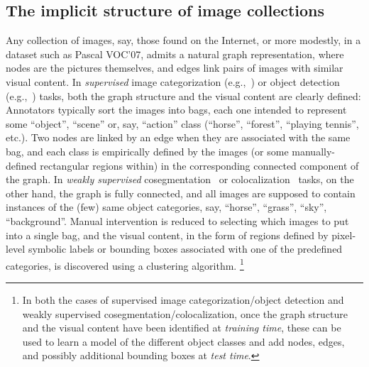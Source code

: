 \documentclass[10pt,twocolumn,letterpaper]{article}
\numberwithin{theorem}{section}
\begin{document}
\subsection{The implicit structure of image collections}
Any collection of images, say, those found on the Internet, or more
modestly, in a dataset such as Pascal VOC'07, admits a natural graph
representation, where nodes are the pictures themselves, and edges
link pairs of images with similar visual content.  In {\em supervised}
image categorization
(e.g.,~\cite{krizhevsky2012imagenet,Lazebnik2006}) or object
detection (e.g.,~\cite{felzenszwalb2010object,He17,Ren15}) tasks, both the graph
structure and the visual content are clearly defined: Annotators
typically sort the images into bags, each one intended to represent
some ``object'', ``scene'' or, say, ``action'' class (``horse'',
``forest'', ``playing tennis'', etc.). Two nodes are linked by an edge
when they are associated with the same bag, and each class is
empirically defined by the images (or some manually-defined
rectangular regions within) in the corresponding connected component
of the graph. 
In {\em weakly supervised}
cosegmentation~\cite{Joulin2010,Kim2011,Rubinstein2013} or
colocalization~\cite{Deselaers:2010he,Joulin14,Tang14} tasks, on the
other hand, the graph is fully connected, and all images are supposed
to contain instances of the (few) same object categories, say,
``horse'', ``grass'', ``sky'', ``background''. Manual intervention is
reduced to selecting which images to put into a single bag, and the
visual content, in the form of regions defined by pixel-level symbolic
labels or bounding boxes associated with one of the predefined
categories, is discovered using a clustering algorithm.
\footnote{In both the cases of
  supervised image categorization/object detection and
  weakly supervised cosegmentation/colocalization, once the graph
  structure and the visual content have been identified at {\em
    training time}, these can be used to learn a model of the
  different object classes and add nodes, edges, and possibly
  additional bounding boxes at {\em test time}.}
\end{document}
